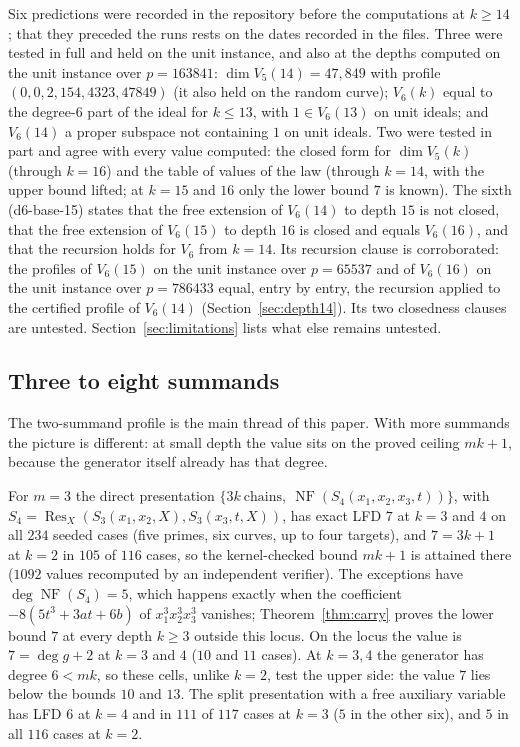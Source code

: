 \documentclass[11pt]{article}
\theoremstyle{definition}\newtheorem{definition}[theorem]{Definition}
\theoremstyle{remark}\newtheorem{remark}[theorem]{Remark}
\newcommand{\NF}{\operatorname{NF}}
\newcommand{\codeus}{\textunderscore\allowbreak}
\newcommand{\code}[1]{{\ttfamily\let\_\codeus#1}}
\begin{document}
Six predictions were recorded in the repository before the computations at
$k\ge14$; that they preceded the runs rests on the dates recorded in the
files. Three were tested in full and held on the unit instance, and also at
the depths computed on the unit instance over $p=163841$:
$\dim V_5(14)=47{,}849$ with profile $(0,0,2,154,4323,47849)$ (it also held
on the random curve); $V_6(k)$ equal to the degree-$6$ part of the ideal for
$k\le13$, with $1\in V_6(13)$ on unit ideals; and $V_6(14)$ a proper
subspace not containing $1$ on unit ideals. Two were tested in part and
agree with every value computed: the closed form for $\dim V_5(k)$ (through
$k=16$) and the table of values of the law (through $k=14$, with the upper
bound lifted; at $k=15$ and $16$ only the lower bound $7$ is known). The
sixth (\code{d6-base-15}) states that the free extension of $V_6(14)$ to
depth $15$ is not closed, that the free extension of $V_6(15)$ to depth
$16$ is closed and equals $V_6(16)$, and that the recursion holds for $V_6$
from $k=14$. Its recursion clause is corroborated: the profiles of
$V_6(15)$ on the unit instance over $p=65537$ and of $V_6(16)$ on the unit
instance over $p=786433$ equal, entry by entry, the recursion applied to the
certified profile of $V_6(14)$ (Section~\ref{sec:depth14}). Its two
closedness clauses are untested. Section~\ref{sec:limitations} lists what
else remains untested.

\subsection{Three to eight summands}\label{sec:msummands}
The two-summand profile is the main thread of this paper. With more summands
the picture is different: at small depth the value sits on the proved
ceiling $mk+1$, because the generator itself already has that degree.

For $m=3$ the direct presentation
$\{3k\ \text{chains},\ \NF(S_4(x_1,x_2,x_3,t))\}$, with
$S_4=\operatorname{Res}_X(S_3(x_1,x_2,X),S_3(x_3,t,X))$, has exact LFD $7$
at $k=3$ and $4$ on all $234$ seeded cases (five primes, six curves, up to
four targets), and $7=3k+1$ at $k=2$ in $105$ of $116$ cases, so the
kernel-checked bound $mk+1$ is attained there ($1092$ values recomputed by
an independent verifier). The exceptions have $\deg\NF(S_4)=5$, which
happens exactly when the coefficient $-8(5t^3+3at+6b)$ of
$x_1^3x_2^3x_3^3$ vanishes; Theorem~\ref{thm:carry} proves the lower bound
$7$ at every depth $k\ge3$ outside this locus. On the locus the value is
$7=\deg g+2$ at $k=3$ and $4$ ($10$ and $11$ cases). At $k=3,4$ the
generator has degree $6<mk$, so these cells, unlike $k=2$, test the upper
side: the value $7$ lies below the bounds $10$ and $13$. The split
presentation with a free auxiliary variable has LFD $6$ at $k=4$ and in
$111$ of $117$ cases at $k=3$ ($5$ in the other six), and $5$ in all $116$
cases at $k=2$.
\end{document}
